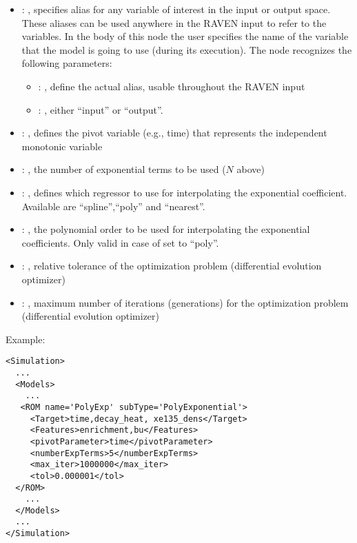 \begin{itemize}
    \item {}: , 
      specifies alias for         any variable of interest in the input or output space. These
      aliases can be used anywhere in the RAVEN input to         refer to the variables. In the body
      of this node the user specifies the name of the variable that the model is going to use
      (during its execution).
      The  node recognizes the following parameters:
        \begin{itemize}
          \item {}: , 
            define the actual alias, usable throughout the RAVEN input
          \item {}: , 
            either ``input'' or ``output''.
      \end{itemize}

    \item {}: , 
      defines the pivot variable (e.g., time) that represents the
      independent monotonic variable

    \item {}: , 
      the number of exponential terms to be used ($N$ above)

    \item {}: , 
      defines which regressor to use for interpolating the
      exponential coefficient. Available are ``spline'',``poly'' and ``nearest''.

    \item {}: , 
      the polynomial order to be used for interpolating the exponential
      coefficients. Only valid in case of   set to ``poly''.

    \item {}: , 
      relative tolerance of the optimization problem (differential evolution optimizer)

    \item {}: , 
      maximum number of iterations (generations) for the
      optimization problem  (differential evolution optimizer)
  \end{itemize}

\hspace{24pt}
Example:
\begin{lstlisting}[style=XML,morekeywords={name,subType}]
<Simulation>
  ...
  <Models>
    ...
   <ROM name='PolyExp' subType='PolyExponential'>
     <Target>time,decay_heat, xe135_dens</Target>
     <Features>enrichment,bu</Features>
     <pivotParameter>time</pivotParameter>
     <numberExpTerms>5</numberExpTerms>
     <max_iter>1000000</max_iter>
     <tol>0.000001</tol>
  </ROM>
    ...
  </Models>
  ...
</Simulation>
\end{lstlisting}

